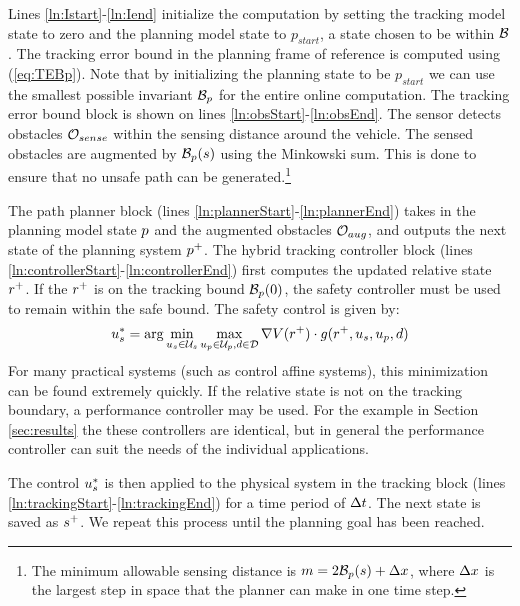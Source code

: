 Lines \ref{ln:Istart}-\ref{ln:Iend} initialize the computation by setting the tracking model state to zero and the planning model state to $p_{start}$, a state chosen to be within $\mathcal B$. The tracking error bound in the planning frame of reference is computed using (\ref{eq:TEBp}). Note that by initializing the planning state to be $p_{start}$ we can use the smallest possible invariant $\mathcal B_p$ for the entire online computation. The tracking error bound block is shown on lines \ref{ln:obsStart}-\ref{ln:obsEnd}. The sensor detects obstacles $\mathcal{O}_{sense}$ within the sensing distance around the vehicle. The sensed obstacles are augmented by $\mathcal B_p(s)$ using the Minkowski sum. This is done to ensure that no unsafe path can be generated.\footnote{The minimum allowable sensing distance is $m = 2\mathcal B_p(s) + \Delta x$, where $\Delta x$ is the largest step in space that the planner can make in one time step.}


 The path planner block (lines \ref{ln:plannerStart}-\ref{ln:plannerEnd}) takes in the planning model state $p$ and the augmented obstacles $\mathcal{O}_{aug}$, and outputs the next state of the planning system $p^+$. The hybrid tracking controller block (lines \ref{ln:controllerStart}-\ref{ln:controllerEnd}) first computes the updated relative state $r^+$. If the $r^+$ is on the tracking bound $\mathcal B_p(0)$, the safety controller must be used to remain within the safe bound. The safety control is given by:
\begin{equation}
  \label{eq:opt_ctrl}
	u_s^* = \arg\min_{u_s\in\mathcal{U}_s} \max_{u_p\in\mathcal{U}_p, d\in\mathcal{D}} \nabla V(r^+) \cdot g(r^+,u_s,u_p,d)
\end{equation}
For many practical systems (such as control affine systems), this minimization can be found extremely quickly. If the relative state is not on the tracking boundary, a performance controller may be used. For the example in Section \ref{sec:results} the these controllers are identical, but in general the performance controller can suit the needs of the individual applications.

The control $u_s^*$ is then applied to the physical system in the tracking block (lines \ref{ln:trackingStart}-\ref{ln:trackingEnd}) for a time period of $\Delta t$. The next state is saved as $s^+$. We repeat this process until the planning goal has been reached.